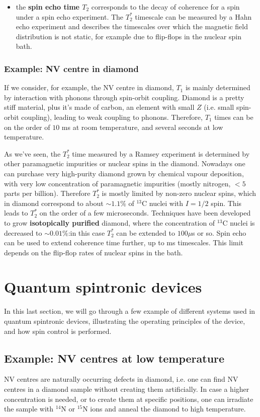 \documentclass[a4paper,11pt]{article}
\begin{document}
\begin{itemize}
    \item the {\bf spin echo time $T_2$} corresponds to the decay of coherence for a spin under a spin echo experiment. The $T_2^*$ timescale can be measured by a Hahn echo experiment and describes the timescales over which the magnetic field distribution is not static, for example due to flip-flops in the nuclear spin bath.
    
    \end{itemize}
    
\subsubsection{Example: NV centre in diamond}
If we consider, for example, the NV centre in diamond, $T_1$ is mainly determined by interaction with phonons through spin-orbit coupling. Diamond is a pretty stiff material, plus it's made of carbon, an element with small $Z$ (i.e. small spin-orbit coupling), leading to weak coupling to phonons. Therefore, $T_1$ times can be on the order of $10$ ms at room temperature, and several seconds at low temperature.

As we've seen, the $T_2^*$ time measured by a Ramsey experiment is determined by other paramagnetic impurities or nuclear spins in the diamond. Nowadays one can purchase very high-purity diamond grown by chemical vapour deposition, with very low concentration of paramagnetic impurities (mostly nitrogen, $<5$ parts per billion). Therefore $T_2^*$ is mostly limited by non-zero nuclear spins, which in diamond correspond to about $\sim 1.1\%$ of $^{13}$C nuclei with $I=1/2$ spin. This leads to $T_2^*$ on the order of a few microseconds. Techniques have been developed to grow {\bf isotopically purified} diamond, where the concentration of $^{13}$C nuclei is decreased to $\sim 0.01\%$:in this case $T_2^*$ can be extended to $100 \mu$s or so.
\newline Spin echo can be used to extend coherence time further, up to ms timescales. This limit depends on the flip-flop rates of nuclear spins in the bath.
\section{Quantum spintronic devices}
In this last section, we will go through a few example of different systems used in quantum spintronic devices, illustrating the operating principles of the device, and how spin control is performed.
\subsection {Example: NV centres at low temperature}
NV centres are naturally occurring defects in diamond, i.e. one can find NV centres in a diamond sample without creating them artificially. In case a higher concentration is needed, or to create them at specific positions, one can irradiate the sample with $^{14}$N or $^{15}$N ions and anneal the diamond to high temperature.
\end{document}
